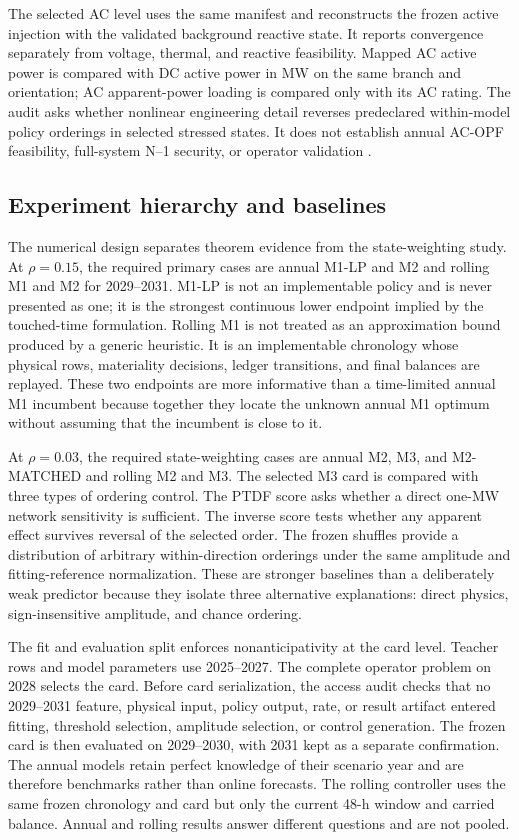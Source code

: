 \documentclass[10pt,journal]{IEEEtran}
\begin{document}
The selected AC level uses the same manifest and reconstructs the frozen active injection with the validated background reactive state. It reports convergence separately from voltage, thermal, and reactive feasibility. Mapped AC active power is compared with DC active power in MW on the same branch and orientation; AC apparent-power loading is compared only with its AC rating. The audit asks whether nonlinear engineering detail reverses predeclared within-model policy orderings in selected stressed states. It does not establish annual AC-OPF feasibility, full-system N--1 security, or operator validation \cite{Stott2009,Ronellenfitsch2017,Thurner2018}.

\subsection{Experiment hierarchy and baselines}

The numerical design separates theorem evidence from the state-weighting study. At $\rho=0.15$, the required primary cases are annual M1-LP and M2 and rolling M1 and M2 for 2029--2031. M1-LP is not an implementable policy and is never presented as one; it is the strongest continuous lower endpoint implied by the touched-time formulation. Rolling M1 is not treated as an approximation bound produced by a generic heuristic. It is an implementable chronology whose physical rows, materiality decisions, ledger transitions, and final balances are replayed. These two endpoints are more informative than a time-limited annual M1 incumbent because together they locate the unknown annual M1 optimum without assuming that the incumbent is close to it.

At $\rho=0.03$, the required state-weighting cases are annual M2, M3, and M2-MATCHED and rolling M2 and M3. The selected M3 card is compared with three types of ordering control. The PTDF score asks whether a direct one-MW network sensitivity is sufficient. The inverse score tests whether any apparent effect survives reversal of the selected order. The frozen shuffles provide a distribution of arbitrary within-direction orderings under the same amplitude and fitting-reference normalization. These are stronger baselines than a deliberately weak predictor because they isolate three alternative explanations: direct physics, sign-insensitive amplitude, and chance ordering.

The fit and evaluation split enforces nonanticipativity at the card level. Teacher rows and model parameters use 2025--2027. The complete operator problem on 2028 selects the card. Before card serialization, the access audit checks that no 2029--2031 feature, physical input, policy output, rate, or result artifact entered fitting, threshold selection, amplitude selection, or control generation. The frozen card is then evaluated on 2029--2030, with 2031 kept as a separate confirmation. The annual models retain perfect knowledge of their scenario year and are therefore benchmarks rather than online forecasts. The rolling controller uses the same frozen chronology and card but only the current 48-h window and carried balance. Annual and rolling results answer different questions and are not pooled.
\end{document}
